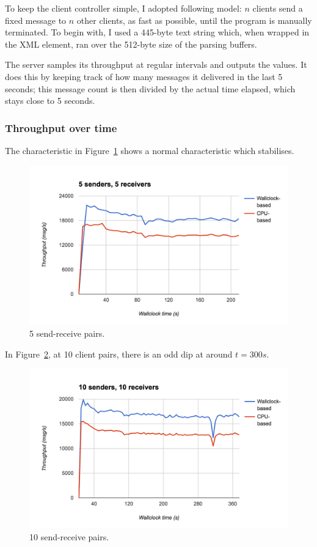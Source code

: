 To keep the client controller simple, I adopted following model: $n$ clients send a fixed message to $n$ other clients, as fast as possible, until the program is manually terminated. To begin with, I used a 445-byte text string which, when wrapped in the XML  element, ran over the 512-byte size of the parsing buffers.

The server samples its throughput at regular intervals and outputs the values. It does this by keeping track of how many messages it delivered in the last 5 seconds; this message count is then divided by the actual time elapsed, which stays close to 5 seconds.

\subsubsection{Throughput over time}
The characteristic in Figure~\ref{fig:5n5} shows a normal characteristic which stabilises.
\begin{figure}
  \centering\includegraphics[width=\textwidth]{../transcripts/lipsum/5n5/5n5.png}
  \caption{5 send-receive pairs.}
  \label{fig:5n5}
\end{figure}

In Figure~\ref{fig:10n10}, at 10 client pairs, there is an odd dip at around $t=300s$.
\begin{figure}
  \centering\includegraphics[width=\textwidth]{../transcripts/lipsum/10n10/10n10.png}
  \caption{10 send-receive pairs.}
  \label{fig:10n10}
\end{figure}

